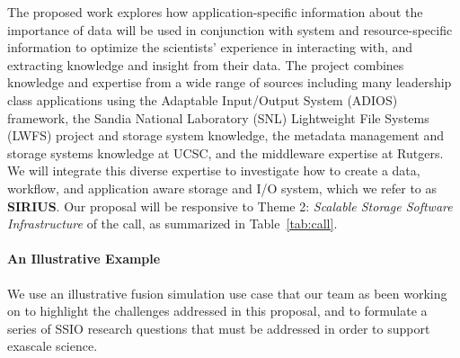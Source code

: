 The proposed work explores how application-specific information about the
importance of data will be used in conjunction with system and
resource-specific information to optimize the scientists' experience in
interacting with, and extracting knowledge and insight from their data.
%
The project combines knowledge and expertise 
from a wide range of sources including many leadership class applications using the Adaptable Input/Output System (ADIOS) framework,
the Sandia National Laboratory (SNL) Lightweight File Systems (LWFS) project and storage system knowledge, the metadata
management and storage systems knowledge at UCSC, and the middleware expertise
at Rutgers. We will integrate this diverse expertise to investigate how to create
a data, workflow, and application aware storage and I/O system, which we refer to as
{\bf SIRIUS}.
%
Our proposal will be responsive to Theme 2: {\em Scalable Storage Software Infrastructure} of the call, as summarized in Table~\ref{tab:call}.

%
\paragraph{An Illustrative Example}
We use an illustrative fusion simulation use case that our team as been working on to highlight the challenges addressed in this proposal, and to 
formulate a series of SSIO research questions that must be addressed in order to support exascale science.

